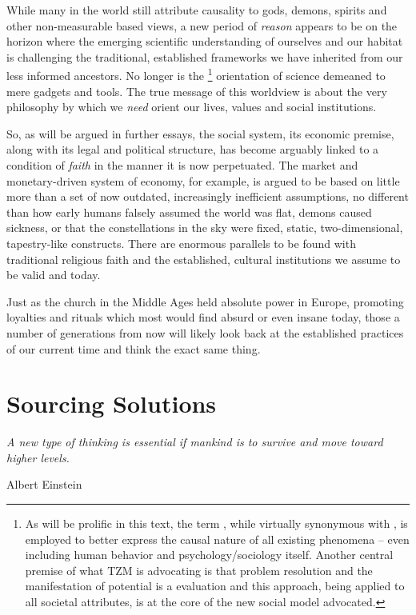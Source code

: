 \documentclass[10pt, a4paper, cleardoubleempty, openright, twoside]{book}
\begin{document}
While many in the world still attribute causality to gods, demons,
spirits and other non-measurable  based views, a new
period of \emph{reason} appears to be on the horizon where the emerging
scientific understanding of ourselves and our habitat is challenging the
traditional, established frameworks we have inherited from our less
informed ancestors. No longer is the \footnote{
	As will be prolific in this text, the term ,
	while virtually synonymous with , is employed to
	better express the causal nature of all existing phenomena -- even
	including human behavior and psychology/sociology itself. Another
	central premise of what TZM is advocating is that problem resolution
	and the manifestation of potential is a 
	evaluation and this approach, being applied to all societal
	attributes, is at the core of the new social model advocated.
} 
orientation of science demeaned to mere gadgets and tools. The true
message of this worldview is about the very philosophy by which we
\emph{need} orient our lives, values and social institutions.

So, as will be argued in further essays, the social system, its economic
premise, along with its legal and political structure, has become
arguably linked to a condition of \emph{faith} in the manner it is now
perpetuated. The market and monetary-driven system of economy, for
example, is argued to be based on little more than a set of now
outdated, increasingly inefficient assumptions, no different than how
early humans falsely assumed the world was flat, demons caused sickness,
or that the constellations in the sky were fixed, static,
two-dimensional, tapestry-like constructs. There are enormous parallels
to be found with traditional religious faith and the established,
cultural institutions we assume to be valid and  today. 

Just as the church in the Middle Ages held absolute power in Europe,
promoting loyalties and rituals which most would find absurd or even
insane today, those a number of generations from now will likely look
back at the established practices of our current time and think the
exact same thing. 


\chapter {Sourcing Solutions}
\epigraph{\itshape
A new type of thinking is essential if mankind is to survive
and move toward higher levels.  
}{Albert Einstein~\cite{Einstein:NewYorkTimes:69}}
\end{document}
